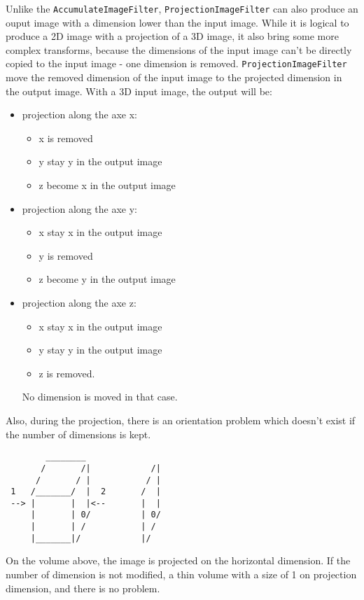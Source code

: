 \documentclass{InsightArticle}
\begin{document}
Unlike the \verb$AccumulateImageFilter$, \verb$ProjectionImageFilter$ can 
also produce an ouput image with a dimension lower than the input image.
While it is logical to produce a 2D image with a projection of a 3D image,
it also bring some more complex transforms, because the dimensions of the
input image can't be directly copied to the input image - one dimension is
removed. \verb$ProjectionImageFilter$ move the removed dimension of the
input image to the projected dimension in the output image. With a 3D
input image, the output will be:
\begin{itemize}
  \item projection along the axe x:
	\begin{itemize}
	\item x is removed
	\item y stay y in the output image
	\item z become x in the output image
	\end{itemize}
  \item projection along the axe y:
	\begin{itemize}
	\item x stay x in the output image
	\item y is removed
	\item z become y in the output image
	\end{itemize}
  \item projection along the axe z:
	\begin{itemize}
	\item x stay x in the output image
	\item y stay y in the output image
	\item z is removed.
	\end{itemize}
       No dimension is moved in that case.
\end{itemize}

Also, during the projection, there is an orientation problem which doesn't
exist if the number of dimensions is kept.

\small \begin{verbatim}
        ________
       /       /|            /|
      /       / |           / |
 1   /_______/  |  2       /  |
 --> |       |  |<--       |  |
     |       | 0/          | 0/
     |       | /           | /
     |_______|/            |/
\end{verbatim} \normalsize
 
 
On the volume above, the image is projected on the horizontal dimension.
If the number of dimension is not modified, a thin volume with a size of
1 on projection dimension, and there is no problem.
 
\end{document}
